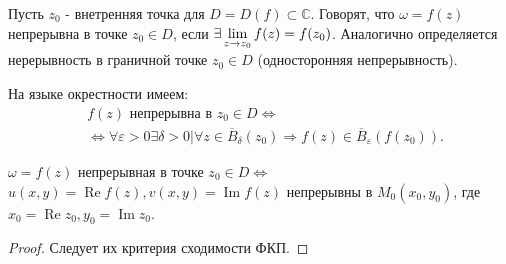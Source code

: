 Пусть $z_0$ - внетренняя точка для $D = D(f) \subset \mathbb{C}$. Говорят, что $\omega = f(z)$
непрерывна в точке $z_0 \in D$, если $\exists \lim\limits_{z \to z_0}f(z) = f(z_0)$. Аналогично определяется
нерерывность в граничной точке $z_0 \in D$ (односторонняя непрерывность).

На языке окрестности имеем:
\begin{align*}
  &f(z) \text{ непрерывна в } z_0 \in D \Leftrightarrow\\
  &\Leftrightarrow \forall \varepsilon > 0 \exists \delta > 0 \vert \forall z \in
  \overline{B}_{\delta}(z_0) \Rightarrow f(z) \in \overline{B}_{\varepsilon}(f(z_0)).
\end{align*}

\begin{theorem}
  $\omega = f(z)$ непрерывная в точке $z_0 \in D \Leftrightarrow$
  $u(x, y) = \operatorname{Re}f(z), v(x, y) = \operatorname{Im}f(z)$
  непрерывны в $M_0(x_0, y_0)$, где $x_0 = \operatorname{Re}z_0, y_0 = \operatorname{Im}z_0$.
\end{theorem}
\begin{proof}
  Следует их критерия сходимости ФКП.
\end{proof}
